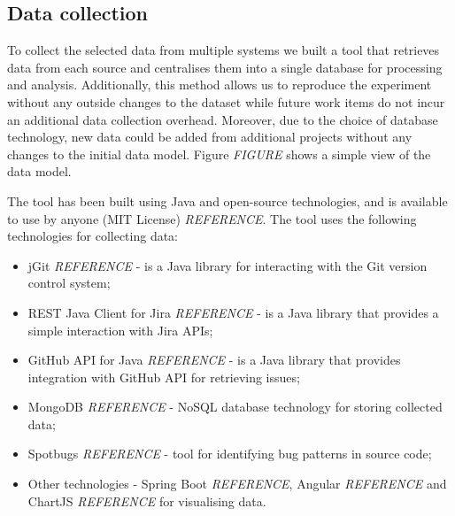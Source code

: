 \documentclass{mpaper}
\begin{document}
\subsection{Data collection}
\label{data-collection}

To collect the selected data from multiple systems we built a tool that
retrieves data from each source and centralises them into a single database for
processing and analysis. Additionally, this method allows us to reproduce the
experiment without any outside changes to the dataset while future work items do
not incur an additional data collection overhead. Moreover, due to the choice of
database technology, new data could be added from additional projects without
any changes to the initial data model. Figure \emph{FIGURE} shows a simple view
of the data model.

The tool has been built using Java and open-source technologies, and is
available to use by anyone (MIT License) \emph{REFERENCE}. The tool uses the
following technologies for collecting data:

\begin{itemize}
  \item jGit \emph{REFERENCE} - is a Java library for interacting with the Git
  version control system;
  \item REST Java Client for Jira \emph{REFERENCE} - is a Java library that
  provides a simple interaction with Jira APIs;
  \item GitHub API for Java \emph{REFERENCE} - is a Java library that provides
  integration with GitHub API for retrieving issues;
  \item MongoDB \emph{REFERENCE} - NoSQL database technology for storing
  collected data;
  \item Spotbugs \emph{REFERENCE} - tool for identifying bug patterns in source
  code;
  \item Other technologies - Spring Boot \emph{REFERENCE}, Angular \emph{REFERENCE} and ChartJS \emph{REFERENCE}
  for visualising data.
\end{itemize}
\end{document}
